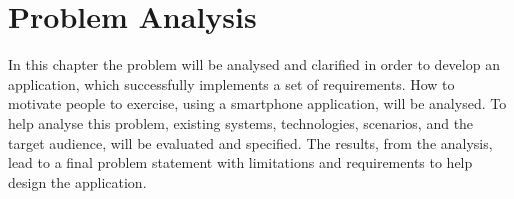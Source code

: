 \chapter{Problem Analysis}
\label{chapter:problem-analysis}
In this chapter the problem will be analysed and clarified in order to develop an application, which successfully implements a set of requirements.
How to motivate people to exercise, using a smartphone application, will be analysed.
To help analyse this problem, existing systems, technologies, scenarios, and the target audience, will be evaluated and specified.
The results, from the analysis, lead to a final problem statement with limitations and requirements to help design the application.









